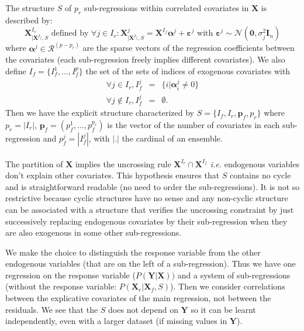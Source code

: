 \documentclass[12pt,a4paper]{report}
\begin{document}
 

The structure $S$ of $p_r$ sub-regressions within correlated covariates in $\boldsymbol{X}$ is described by:
	\begin{equation}
		\boldsymbol{X}^{I_r}_{|\boldsymbol{X}^{I_f},S} \textrm{ defined by }\forall j \in I_r: \boldsymbol{X}^j_{|\boldsymbol{X}^{I_f},S}=\boldsymbol{X}^{I_f}\boldsymbol{\alpha}^j+\boldsymbol{\varepsilon}^j \textrm{ with } \boldsymbol{\varepsilon}^j \sim\mathcal{N}(\boldsymbol{0},\sigma^2_j\boldsymbol{I}_n) \label{SR}
	\end{equation}
		where $\boldsymbol{\alpha}^j \in \mathcal{R}^{(p-p_r)}$ are the sparse vectors of the regression coefficients between the covariates (each sub-regression freely implies different covariates). 
We also define $I_f=\{I_f^1,\dots,I_f^p \}$ the set of the sets of indices of exogenous covariates with
\begin{eqnarray}
	\forall j \in I_r, I_f^j&=&\{i|\boldsymbol{\alpha}^j_i\neq 0 \} \\
	\forall j \notin I_r, I_f^j&=&\emptyset .
\end{eqnarray}
Then we have the explicit structure characterized by $S=\{I_f,I_r,\boldsymbol{p}_f,p_r\}$ where $p_r=|I_r|$, $\boldsymbol{p}_f=(p_f^1,\dots,p_f^{p_r})$ is the vector of the number of covariates in each sub-regression  and $p_f^j=|I_f^j|$, with $|.|$ the cardinal of an ensemble. 
\\
\\


The partition of $\boldsymbol{X}$ implies the uncrossing rule  $\boldsymbol{X}^{I_r} \cap \boldsymbol{X}^{I_f}$ 
{\it i.e.} endogenous variables don't explain other covariates. This hypothesis ensures that $S$ contains no cycle and is straightforward readable (no need to order the sub-regressions). It is not so restrictive because cyclic structures have no sense and any non-cyclic structure can be associated with a structure that verifies the uncrossing constraint by just successively replacing endogenous covariates by their sub-regression when they are also exogenous in some other sub-regressions.

	
	  We make the choice to distinguish the response variable from the other endogenous variables (that are on the left of a sub-regression). Thus we have one regression on the response variable ($P(\boldsymbol{Y}|\boldsymbol{X}))$ and a system of sub-regressions (without the response variable: $P(\boldsymbol{X}_r|\boldsymbol{X}_f,S)$). Then we consider correlations between the explicative covariates of the main regression, not between the residuals. We see that the $S$ does not depend on $\boldsymbol{Y}$ so it can be learnt independently, even with a larger dataset (if missing values in $\boldsymbol{Y}$).
	 
\end{document}
